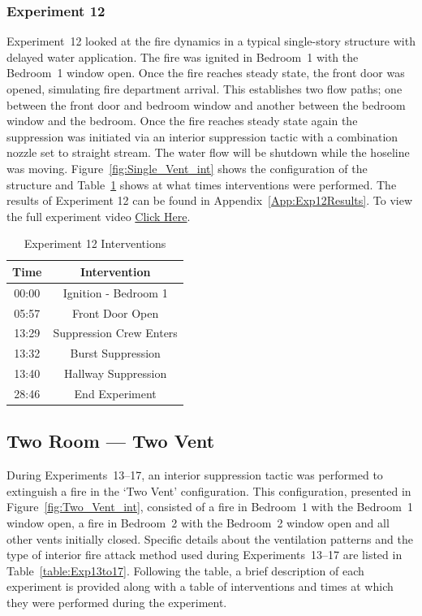 \documentclass[12pt,oneside]{book}
\begin{document}
\subsubsection{Experiment 12}
Experiment~12 looked at the fire dynamics in a typical single-story structure with delayed water application. The fire was ignited in Bedroom~1 with the Bedroom~1 window open. Once the fire reaches steady state, the front door was opened, simulating fire department arrival. This establishes two flow paths; one between the front door and bedroom window and another between the bedroom window and the bedroom. Once the fire reaches steady state again the suppression was initiated via an interior suppression tactic with a combination nozzle set to straight stream. The water flow will be shutdown while the hoseline was moving.  Figure~\ref{fig:Single_Vent_int} shows the configuration of the structure and Table~\ref{Table:Exp12Interventions} shows at what times interventions were performed. The results of Experiment 12 can be found in Appendix~\ref{App:Exp12Results}. To view the full experiment video \href{https://player.vimeo.com/video/170510940?autoplay=1}{Click Here}.

\begin{table}[H]
	\centering
	\caption{Experiment 12 Interventions}
	\begin{tabular}{|c|c|} 
		\hline
		Time & Intervention \\ \hline \hline
		00:00 & Ignition - Bedroom 1 \\ \hline
		05:57 & Front Door Open \\ \hline
		13:29 & Suppression Crew Enters\\ \hline
		13:32 & Burst Suppression \\ \hline 
		13:40 & Hallway Suppression \\ \hline
		28:46 & End Experiment\\ \hline
	\end{tabular}
	\label{Table:Exp12Interventions}
\end{table}

\clearpage

\subsection{Two Room --- Two Vent}

During Experiments~13--17, an interior suppression tactic was performed to extinguish a fire in the `Two Vent' configuration. This configuration, presented in Figure~\ref{fig:Two_Vent_int}, consisted of a fire in Bedroom~1 with the Bedroom~1 window open, a fire in Bedroom~2 with the Bedroom~2 window open and all other vents initially closed. Specific details about the ventilation patterns and the type of interior fire attack method used during Experiments~13--17 are listed in Table~\ref{table:Exp13to17}. Following the table, a brief description of each experiment is provided along with a table of interventions and times at which they were performed during the experiment. 
\end{document}
